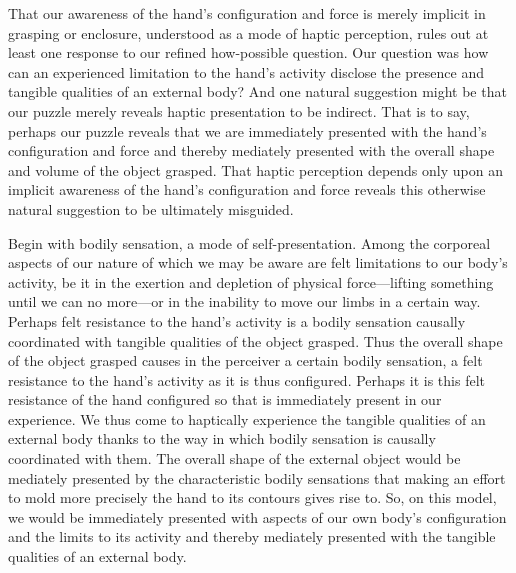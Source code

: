 \documentclass[12pt]{article}
\begin{document}

That our awareness of the hand's configuration and force is merely implicit in grasping or enclosure, understood as a mode of haptic perception, rules out at least one response to our refined how-possible question. Our question was how can an experienced limitation to the hand's activity disclose the presence and tangible qualities of an external body? And one natural suggestion might be that our puzzle merely reveals haptic presentation to be indirect. That is to say, perhaps our puzzle reveals that we are immediately presented with the hand's configuration and force and thereby mediately presented with the overall shape and volume of the object grasped. That haptic perception depends only upon an implicit awareness of the hand's configuration and force reveals this otherwise natural suggestion to be ultimately misguided.

Begin with bodily sensation, a mode of self-presentation. Among the corporeal aspects of our nature of which we may be aware are felt limitations to our body's activity, be it in the exertion and depletion of physical force---lifting something until we can no more---or in the inability to move our limbs in a certain way. Perhaps felt resistance to the hand's activity is a bodily sensation causally coordinated with tangible qualities of the object grasped. Thus the overall shape of the object grasped causes in the perceiver a certain bodily sensation, a felt resistance to the hand's activity as it is thus configured. Perhaps it is this felt resistance of the hand configured so that is immediately present in our experience. We thus come to haptically experience the tangible qualities of an external body thanks to the way in which bodily sensation is causally coordinated with them. The overall shape of the external object would be mediately presented by the characteristic bodily sensations that making an effort to mold more precisely the hand to its contours gives rise to. So, on this model, we would be immediately presented with aspects of our own body's configuration and the limits to its activity and thereby mediately presented with the tangible qualities of an external body.

\end{document}
